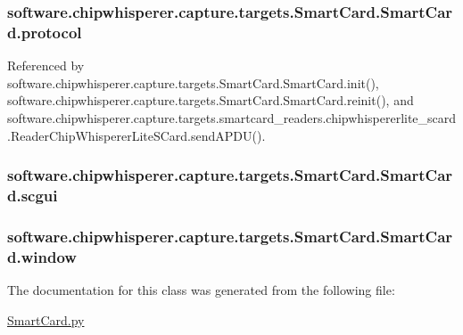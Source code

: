 \subsubsection[{protocol}]{\setlength{\rightskip}{0pt plus 5cm}software.\+chipwhisperer.\+capture.\+targets.\+Smart\+Card.\+Smart\+Card.\+protocol}\label{classsoftware_1_1chipwhisperer_1_1capture_1_1targets_1_1SmartCard_1_1SmartCard_a70bb91d5c2c8be604a549ed5ee23510a}


Referenced by software.\+chipwhisperer.\+capture.\+targets.\+Smart\+Card.\+Smart\+Card.\+init(), software.\+chipwhisperer.\+capture.\+targets.\+Smart\+Card.\+Smart\+Card.\+reinit(), and software.\+chipwhisperer.\+capture.\+targets.\+smartcard\+\_\+readers.\+chipwhispererlite\+\_\+scard.\+Reader\+Chip\+Whisperer\+Lite\+S\+Card.\+send\+A\+P\+D\+U().

\hypertarget{classsoftware_1_1chipwhisperer_1_1capture_1_1targets_1_1SmartCard_1_1SmartCard_acb4bd44ef4b1ad21a36cf91e962b9de4}{}
\subsubsection[{scgui}]{\setlength{\rightskip}{0pt plus 5cm}software.\+chipwhisperer.\+capture.\+targets.\+Smart\+Card.\+Smart\+Card.\+scgui}\label{classsoftware_1_1chipwhisperer_1_1capture_1_1targets_1_1SmartCard_1_1SmartCard_acb4bd44ef4b1ad21a36cf91e962b9de4}
\hypertarget{classsoftware_1_1chipwhisperer_1_1capture_1_1targets_1_1SmartCard_1_1SmartCard_aa2af4947f4c6321899b42da2e09d34e1}{}
\subsubsection[{window}]{\setlength{\rightskip}{0pt plus 5cm}software.\+chipwhisperer.\+capture.\+targets.\+Smart\+Card.\+Smart\+Card.\+window}\label{classsoftware_1_1chipwhisperer_1_1capture_1_1targets_1_1SmartCard_1_1SmartCard_aa2af4947f4c6321899b42da2e09d34e1}


The documentation for this class was generated from the following file\+:\begin{DoxyCompactItemize}
\item 
\hyperlink{SmartCard_8py}{Smart\+Card.\+py}\end{DoxyCompactItemize}
